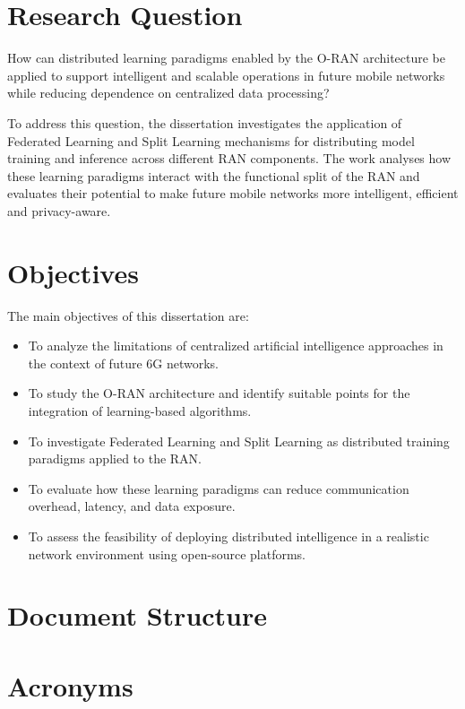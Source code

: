 \section{Research Question}

How can distributed learning paradigms enabled by the O-RAN architecture be applied to support intelligent and scalable operations in future mobile networks while reducing dependence on centralized data processing?

\vspace{3mm}

To address this question, the dissertation investigates the application of Federated Learning and Split Learning mechanisms for distributing model training and inference across different RAN components. The work analyses how these learning paradigms interact with the functional split of the RAN and evaluates their potential to make future mobile networks more intelligent, efficient and privacy-aware.

\section{Objectives}

The main objectives of this dissertation are:
\begin{itemize}
    \item To analyze the limitations of centralized artificial intelligence approaches in the context of future 6G networks.
    \item To study the O-RAN architecture and identify suitable points for the integration of learning-based algorithms.
    \item To investigate Federated Learning and Split Learning as distributed training paradigms applied to the RAN.
    \item To evaluate how these learning paradigms can reduce communication overhead, latency, and data exposure.
    \item To assess the feasibility of deploying distributed intelligence in a realistic network environment using open-source platforms.
\end{itemize}

\section{Document Structure}


\section{Acronyms}

